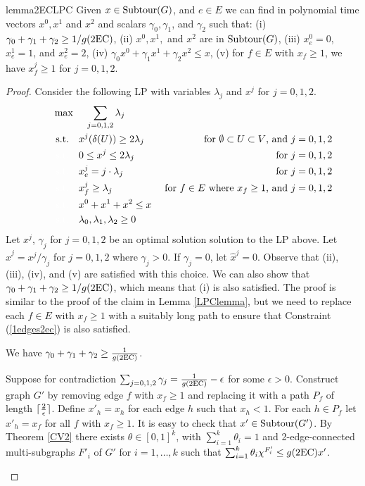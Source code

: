 \begin{restatable}{lemma}{2ECLPC}
	\label{LPC2EC}
	Given $x\in \operatorname{{Subtour}}(G)$, and $e\in E$ we can find in polynomial time vectors $x^0,x^1$ and $x^2$ and scalars $\gamma_0,\gamma_1$, and $\gamma_2$ such that: (i) $\gamma_0 + \gamma_1 +\gamma_2 \geq { 1}/{g(\2ec)}$, (ii) $x^0,x^1,$ and $x^2$ are in  $ \operatorname{{Subtour}}(G)$, (iii) $x^0_e=0$, $x^1_e=1$, and $x^2_e=2$, (iv) $\gamma_0 x^0 + \gamma_1{x}^1  + \gamma_2x^2\leq {x}$, (v) for $f\in E$ with ${x}_f\geq 1$, we have $x^j_f\geq 1$ for $j=0,1,2$.
\end{restatable}

\begin{proof}
	Consider the following LP with variables $\lambda_j$ and $x^j$ for $j=0,1,2$. 
	\begin{align}
	\quad\quad& \max\quad \;\sum_{j=0,1,2}\lambda_j\\
	&\;\text{s.t.} \quad x^j(\delta(U))\geq 2\lambda_j \;& \mbox{ for $\emptyset \subset U \subset V$, and $j=0,1,2$} \label{feasibility2ec}\\
	&\;{\color{white}{\text{s.t.}} }\quad 0 \leq x^j \leq 2\lambda_j\; &\mbox{ for $j=0,1,2$}\label{bound2ec}\\
	&\;{\color{white}{\text{s.t.}} }\quad x^j_e =j\cdot \lambda_j\; &\mbox{ for $j=0,1,2$}\label{branchcoordinate2ec}\\
	&\;{\color{white}{\text{s.t.}} }\quad x^j_f \geq \lambda_j \; &\mbox{ for $f\in E$ where $x_f \geq 1$, and $j=0,1,2$}\label{1edges2ec}\\
	&\;{\color{white}{\text{s.t.}} }\quad x^0 + x^1+x^2 \leq x\label{packing2ec}\\
	&\;{\color{white}{\text{s.t.}} }\quad \lambda_0,\lambda_1,\lambda_2 \geq 0
	\end{align}	Let $x^j$, $\gamma_j$ for $j=0,1,2$ be an optimal solution solution to the LP above. Let $\hat{x}^{j}={x^j}/{\gamma_j}$ for $j=0,1,2$ where $\gamma_j>0$. If $\gamma_j=0$, let $\hat{x}^{j}=0$. Observe that  (ii), (iii), (iv), and (v) are satisfied with this choice. We can also show that $\gamma_0+\gamma_1+\gamma_2\geq {1}/{g(\2ec)}$, which means that (i) is also satisfied. The proof is similar to the proof of the claim in Lemma \ref{LPClemma}, but we need to replace each $f\in E$ with $x_f\geq 1$ with a suitably long path to ensure that Constraint (\ref{1edges2ec}) is also satisfied.	
	\begin{claim}\label{CVexists}
		We have $\gamma_0 + \gamma_1+\gamma_2\geq \frac{1}{g(\2ec)}$.
	\end{claim}
	\begin{cproof}
		Suppose for contradiction $\sum_{j=0,1,2}\gamma_j = \frac{1}{g(\2ec)} - \epsilon$ for some $\epsilon >0$. Construct graph $G'$ by removing edge $f$ with $x_f\geq 1$ and replacing it with a path $P_f$ of length $\lceil\frac{2}{\epsilon}\rceil$. Define $x'_h = x_h$ for each edge $h$ such that $x_h<1$. For each $h\in P_f$ let $x'_h= x_f$ for all $f$ with $x_f\geq 1$. It is easy to check that $x'\in \operatorname{{Subtour}}(G')$. By Theorem \ref{CV2} there exists $\theta \in [0,1]^k$, with $\sum_{i=1}^{k}\theta_i = 1$ and 2-edge-connected multi-subgraphs $F'_i$ of $G'$ for $i=1,\ldots,k$ such that 
		$\sum_{i=1}^{k}\theta_i \chi^{F'_i}\leq g(\2ec)x'$. 
		

\end{cproof}
\end{proof}

